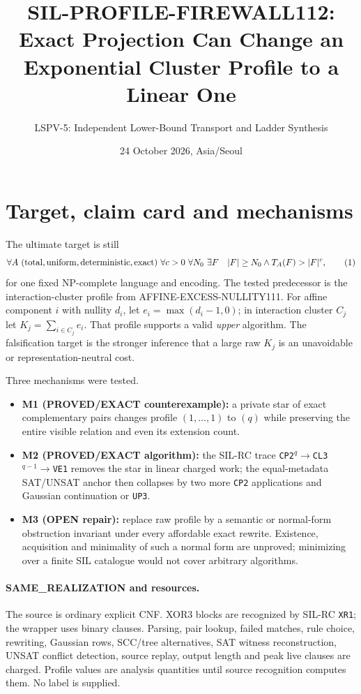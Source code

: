 \documentclass[11pt]{article}
\title{SIL-PROFILE-FIREWALL112: Exact Projection Can Change an\\
Exponential Cluster Profile to a Linear One}
\author{LSPV-5: Independent Lower-Bound Transport and Ladder Synthesis}
\date{24 October 2026, Asia/Seoul}
\newcommand{\PROVED}{\textbf{PROVED/EXACT}}
\newcommand{\OPEN}{\textbf{OPEN}}
\begin{document}
\maketitle
\begin{center}
\end{center}

\section{Target, claim card and mechanisms}
The ultimate target is still
\[
\forall A\ {\rm(total,uniform,deterministic,exact)}\ \forall c>0\ \forall N_0\
\exists F\quad |F|\ge N_0\land T_A(F)>|F|^c,                         \tag{1}
\]
for one fixed NP-complete language and encoding.  The tested predecessor is
the interaction-cluster profile from AFFINE-EXCESS-NULLITY111.  For affine
component $i$ with nullity $d_i$, let $e_i=\max(d_i-1,0)$; in interaction
cluster $C_j$ let $K_j=\sum_{i\in C_j}e_i$.  That profile supports a valid
\emph{upper} algorithm.  The falsification target is the stronger inference
that a large raw $K_j$ is an unavoidable or representation-neutral cost.

Three mechanisms were tested.
\begin{itemize}
\item \textbf{M1 (\PROVED{} counterexample):} a private star of exact
complementary pairs changes profile $(1,\ldots,1)$ to $(q)$ while preserving
the entire visible relation and even its extension count.
\item \textbf{M2 (\PROVED{} algorithm):} the SIL-RC trace
\texttt{CP2}$^q\to$\texttt{CL3}$^{q-1}\to$\texttt{VE1} removes the star in
linear charged work; the equal-metadata SAT/UNSAT anchor then collapses by two
more \texttt{CP2} applications and Gaussian continuation or \texttt{UP3}.
\item \textbf{M3 (\OPEN{} repair):} replace raw profile by a semantic or
normal-form obstruction invariant under every affordable exact rewrite.
Existence, acquisition and minimality of such a normal form are unproved;
minimizing over a finite SIL catalogue would not cover arbitrary algorithms.
\end{itemize}

\paragraph{SAME\_REALIZATION and resources.}
The source is ordinary explicit CNF.  XOR3 blocks are recognized by
SIL-RC \texttt{XR1}; the wrapper uses binary clauses.  Parsing, pair lookup,
failed matches, rule choice, rewriting, Gaussian rows, SCC/tree alternatives,
SAT witness reconstruction, UNSAT conflict detection, source replay, output
length and peak live clauses are charged.  Profile values are analysis
quantities until source recognition computes them.  No label is supplied.
\end{document}
